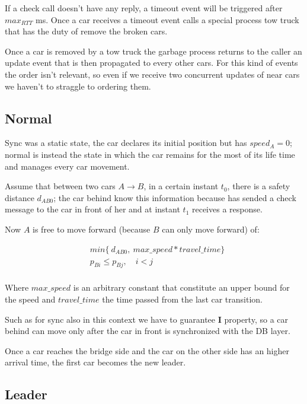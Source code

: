If a check call doesn't have any reply, a timeout event will be triggered after 
$max_{RTT}$ ms. Once a car receives a timeout event calls a special process 
tow truck that has the duty of remove the broken cars.  

Once a car is removed by a tow truck the garbage process returns to the caller 
an update event that is then propagated to every other cars. For this kind of events 
the order isn't relevant, so even if we receive two concurrent updates of near cars 
we haven't to straggle to ordering them.


\subsection{Normal}

Sync was a static state, the car declares its initial position but has $speed_A = 0$;
normal is instead the state in which the car remains for the most of its life time and 
manages every car movement.

Assume that between two cars $A \rightarrow B$, in a certain instant $t_0$, 
there is a safety distance $d_{AB0}$; 
the car behind know this information because has sended a check message to the car 
in front of her and at instant $t_1$ receives a response.

Now $A$ is free to move forward (because $B$ can only move forward) of:

\begin{equation}\begin{split}
    & min\{\ d_{AB0},\ max\_speed * travel\_time \} \\
    & p_{Bi} \leq p_{Bj},\quad i < j \\
\end{split}\end{equation}    

Where $max\_speed$ is an arbitrary constant that constitute an upper bound for the speed 
and $travel\_time$ the time passed from the last car transition. 

Such as for sync also in this context we have to guarantee \textbf{I} property, so 
a car behind can move only after the car in front is synchronized with the DB layer.

Once a car reaches the bridge side and the car on the other side has an 
higher arrival time, the first car becomes the new leader.


\subsection{Leader}

